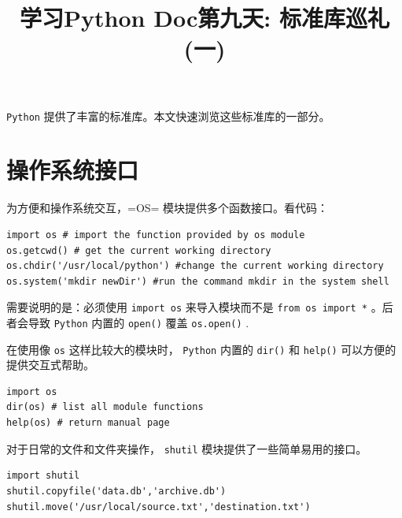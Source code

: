 \documentclass[10pt,a4paper,UTF8]{article}
\date{}
\title{学习Python Doc第九天: 标准库巡礼(一)}
\begin{document}
\maketitle
\tableofcontents
{}
\texttt{Python} 提供了丰富的标准库。本文快速浏览这些标准库的一部分。

\section{操作系统接口}
\label{sec:org5b6adf3}


为方便和操作系统交互，=OS= 模块提供多个函数接口。看代码：
\begin{verbatim}
import os # import the function provided by os module
os.getcwd() # get the current working directory
os.chdir('/usr/local/python') #change the current working directory
os.system('mkdir newDir') #run the command mkdir in the system shell
\end{verbatim}

需要说明的是：必须使用 \texttt{import os} 来导入模块而不是 \texttt{from os import *} 。后者会导致 \texttt{Python} 内置的 \texttt{open()} 覆盖 \texttt{os.open()} .

在使用像 \texttt{os} 这样比较大的模块时， \texttt{Python} 内置的 \texttt{dir()} 和 \texttt{help()} 可以方便的提供交互式帮助。

\begin{verbatim}
import os
dir(os) # list all module functions
help(os) # return manual page
\end{verbatim}

对于日常的文件和文件夹操作， \texttt{shutil} 模块提供了一些简单易用的接口。

\begin{verbatim}
import shutil
shutil.copyfile('data.db','archive.db')
shutil.move('/usr/local/source.txt','destination.txt')
\end{verbatim}
\end{document}

